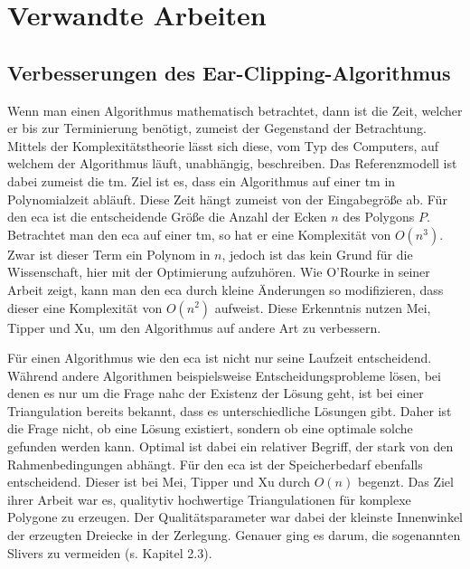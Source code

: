 \section{Verwandte Arbeiten}
\subsection{Verbesserungen des Ear-Clipping-Algorithmus}

Wenn man einen Algorithmus mathematisch betrachtet, dann ist die Zeit, welcher er bis zur Terminierung benötigt, zumeist der
Gegenstand der Betrachtung. Mittels der Komplexitätstheorie lässt sich diese, vom Typ des Computers, auf welchem der Algorithmus 
läuft, unabhängig, beschreiben. Das Referenzmodell ist dabei zumeist die \ac{tm}.\cite{tm} Ziel ist es, dass ein Algorithmus 
auf einer \ac{tm} in Polynomialzeit abläuft. Diese Zeit hängt zumeist von der Eingabegröße ab. Für den \ac{eca} ist die entscheidende 
Größe die Anzahl der Ecken $n$ des Polygons $P$.
Betrachtet man den \ac{eca} auf einer \ac{tm}, so hat er eine Komplexität von $O(n^3)$.
Zwar ist dieser Term ein Polynom in $n$, jedoch ist das kein Grund für die Wissenschaft, hier mit der Optimierung aufzuhören.
Wie O'Rourke in seiner Arbeit zeigt, kann man den \ac{eca} durch kleine Änderungen so modifizieren, dass dieser eine Komplexität von $O(n^2)$
aufweist.\cite{orourke} Diese Erkenntnis nutzen Mei, Tipper und Xu, um den Algorithmus auf andere Art zu verbessern.\cite{earclipping}

Für einen Algorithmus wie den \ac{eca} ist nicht nur seine Laufzeit entscheidend. Während andere Algorithmen beispielsweise Entscheidungsprobleme lösen, 
bei denen es nur um die Frage nahc der Existenz der Lösung geht, ist bei einer Triangulation bereits bekannt, dass es unterschiedliche Lösungen gibt.
Daher ist die Frage nicht, ob eine Lösung existiert, sondern ob eine optimale solche gefunden werden kann. Optimal ist dabei ein relativer Begriff, 
der stark von den Rahmenbedingungen abhängt. Für den \ac{eca} ist der Speicherbedarf ebenfalls entscheidend. Dieser ist bei Mei, Tipper und Xu durch $O(n)$
begenzt. Das Ziel ihrer Arbeit war es, qualitytiv hochwertige Triangulationen für komplexe Polygone zu erzeugen. Der Qualitätsparameter war dabei der kleinste 
Innenwinkel der erzeugten Dreiecke in der Zerlegung. Genauer ging es darum, die sogenannten Slivers zu vermeiden (s. Kapitel 2.3).

